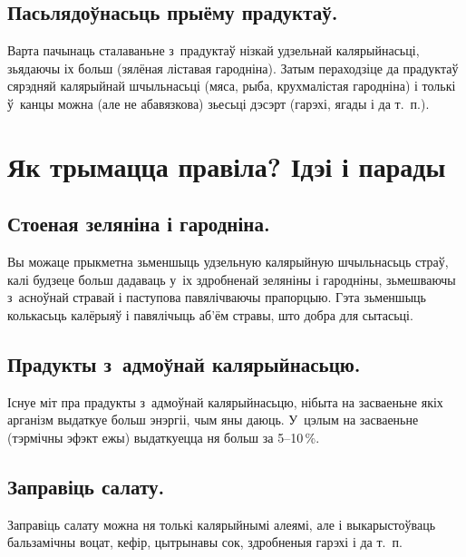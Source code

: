 
\subsection{Пасьлядоўнасьць прыёму прадуктаў.}
Варта пачынаць сталаваньне з~прадуктаў нізкай удзельнай калярыйнасьці, зьядаючы іх больш (зялёная ліставая гародніна). Затым пераходзіце да прадуктаў сярэдняй калярыйнай шчыльнасьці (мяса, рыба, крухмалістая гародніна) і толькі ў~канцы можна (але не абавязкова) зьесьці дэсэрт (гарэхі, ягады і да т.~п.).

\section{Як трымацца правіла? Ідэі і парады}

\subsection{Стоеная зеляніна і гародніна.}
Вы можаце прыкметна зьменшыць удзельную калярыйную шчыльнасьць страў, калі будзеце больш дадаваць у~іх здробненай зеляніны і гародніны, зьмешваючы з~асноўнай стравай і паступова павялічваючы прапорцыю. Гэта зьменшыць колькасьць калёрыяў і павялічыць аб'ём стравы, што добра для сытасьці.

\subsection{Прадукты з~адмоўнай калярыйнасьцю.}
Існуе міт пра прадукты з~адмоўнай калярыйнасьцю, нібыта на засваеньне якіх арганізм выдаткуе больш энэргіі, чым яны даюць. У~цэлым на засваеньне (тэрмічны эфэкт ежы) выдаткуецца ня больш за 5--10\,\%.

\subsection{Заправіць салату.}
Заправіць салату можна ня толькі калярыйнымі алеямі, але і выкарыстоўваць бальзамічны воцат, кефір, цытрынавы сок, здробненыя гарэхі і да т.~п.


